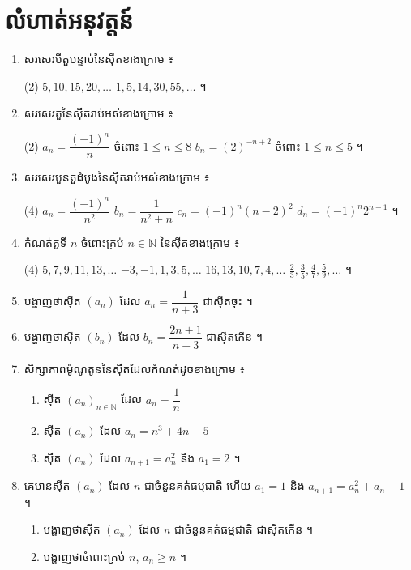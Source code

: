 \section*{លំហាត់អនុវត្តន៍}
\begin{enumerate}[1]
  \item សរសេរបីតួបន្ទាប់នៃស៊ីតខាងក្រោម ៖
  \begin{tasks}(2)
    \task $5, 10, 15, 20, \ldots$
    \task $1, 5, 14, 30, 55, \ldots$ ។
  \end{tasks}
  \item សរសេរតួនៃស៊ីតរាប់អស់ខាងក្រោម ៖
  \begin{tasks}(2)
    \task $a_n = \dfrac{(-1)^n}{n}$ ចំពោះ $1 \le n \le 8$
    \task $b_n = (2)^{-n+2}$ ចំពោះ $1 \le n \le 5$ ។
  \end{tasks}
  \item សរសេរបួនតួដំបូងនៃស៊ីតរាប់អស់ខាងក្រោម ៖
  \begin{tasks}(4)
    \task $a_n = \dfrac{(-1)^n}{n^2}$
    \task $b_n = \dfrac{1}{n^2 + n}$
    \task $c_n = (-1)^n (n-2)^2$
    \task $d_n = (-1)^n 2^{n-1}$ ។
  \end{tasks}
  \item កំណត់តួទី $n$ ចំពោះគ្រប់ $n \in \mathbb{N}$ នៃស៊ីតខាងក្រោម ៖
  \begin{tasks}(4)
    \task $5, 7, 9, 11, 13, \ldots$
    \task $-3, -1, 1, 3, 5, \ldots$
    \task $16, 13, 10, 7, 4, \ldots$
    \task $\frac{2}{3}, \frac{3}{5}, \frac{4}{7}, \frac{5}{9}, \ldots$ ។
  \end{tasks}
  \item បង្ហាញថាស៊ីត $(a_n)$ ដែល $a_n = \dfrac{1}{n+3}$ ជាស៊ីតចុះ ។
  \item បង្ហាញថាស៊ីត $(b_n)$ ដែល $b_n = \dfrac{2n+1}{n+3}$ ជាស៊ីតកើន ។
  \item សិក្សាភាពម៉ូណូតូននៃស៊ីតដែលកំណត់ដូចខាងក្រោម ៖
  \begin{enumerate}[a]
    \item ស៊ីត $(a_n)_{n \in \mathbb{N}}$ ដែល $a_n = \dfrac{1}{n}$
    \item ស៊ីត $(a_n)$ ដែល $a_n = n^3 + 4n - 5$
    \item ស៊ីត $(a_n)$ ដែល $a_{n+1} = a_n^2$ និង $a_1 = 2$ ។
  \end{enumerate}
  \item គេមានស៊ីត $(a_n)$ ដែល $n$ ជាចំនួនគត់ធម្មជាតិ ហើយ $a_1 = 1$ និង $a_{n+1} = a_n^2 + a_n + 1$ ។
  \begin{enumerate}[a]
    \item បង្ហាញថាស៊ីត $(a_n)$ ដែល $n$ ជាចំនួនគត់ធម្មជាតិ ជាស៊ីតកើន ។
    \item បង្ហាញថាចំពោះគ្រប់ $n$, $a_n \ge n$ ។
  \end{enumerate}
\end{enumerate}
